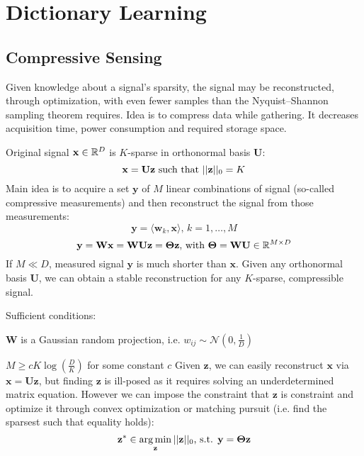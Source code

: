 \documentclass[12pt]{article}
\begin{document}
\section{Dictionary Learning}

\subsection{Compressive Sensing}
\par Given knowledge about a signal's sparsity, the signal may be reconstructed, through optimization, with even fewer samples than the Nyquist–Shannon sampling theorem requires. Idea is to compress data while gathering. It decreases acquisition time, power consumption and required storage space.
\par Original signal $\mathbf{x}\in \mathbb{R}^D$ is $K$-sparse in orthonormal basis $\mathbf{U}$:
\[ \mathbf{x = U z} \text{ such that } ||\mathbf{z}||_0 = K \]
Main idea is to acquire a set $\mathbf{y}$ of $M$ linear combinations of signal (so-called compressive measurements) and then reconstruct the signal from those measurements:
\[ \mathbf{y} = \langle \mathbf{w}_k, \mathbf{x} \rangle \text{, } k = 1,\dots ,M \]
\[ \mathbf{y = W x = W U z = \Theta z} \text{, with } \mathbf{\Theta = W U}\in \mathbb{R}^{M\times D} \]
If $M \ll D$, measured signal $\mathbf{y}$ is much shorter than $\mathbf{x}$. Given any orthonormal basis $\mathbf{U}$, we can obtain a stable reconstruction for any $K$-sparse, compressible signal.
\par Sufficient conditions:
\ulb
\item $\mathbf{W}$ is a Gaussian random projection, i.e. $w_{ij}\sim \mathcal{N}(0,\frac{1}{D})$
\item $M \geq cK\log(\frac{D}{K}) $ for some constant $c$
\ule
Given $\mathbf{z}$, we can easily reconstruct $\mathbf{x}$ via $ \mathbf{x = U z}$, but finding $\mathbf{z}$ is ill-posed as it requires solving an underdetermined matrix equation. However we can impose the constraint that $\mathbf{z}$ is constraint and optimize it through convex optimization or matching pursuit (i.e. find the sparsest such that equality holds):
\[ \mathbf{z}^* \in \operatorname*{arg\,min}_{\mathbf{z}} ||\mathbf{z}||_0 \text{, s.t. } \mathbf{y = \Theta z} \]
\end{document}
